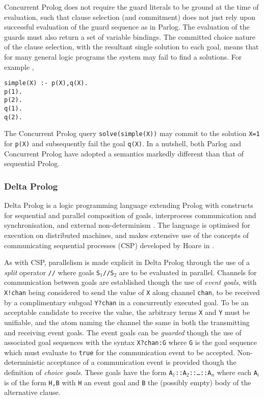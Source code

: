 Concurrent Prolog does not require the guard literals to be ground at
the time of evaluation, such that clause selection (and commitment)
does not just rely upon successful evaluation of the guard sequence as
in Parlog.  The evaluation of the guards must also return a set of
variable bindings.  The committed choice nature of the clause
selection, with the resultant single solution to each goal, means that
for many general logic programs the system may fail to find a
solutions.  For example \cite{Wis86},

\begin{verbatim}
simple(X) :- p(X),q(X).
p(1).
p(2).
q(1).
q(2).
\end{verbatim}
The Concurrent Prolog query \texttt{solve(simple(X))} may commit to the solution
\texttt{X=1} for \texttt{p(X)} and subsequently fail the goal \texttt{q(X)}.
In a nutshell, both Parlog and Concurrent Prolog have adopted a semantics markedly
different than that of sequential Prolog.

\subsubsection{Delta Prolog}


Delta Prolog is a logic programming language extending Prolog with constructs for
sequential and parallel composition of goals, interprocess communication and
synchronisation, and external non-determinism \cite{CMCP92}.  The language is
optimised for execution on distributed machines, and makes extensive use of the
concepts of communicating sequential processes (CSP)
developed by Hoare in \cite{Hoa85}.

As with CSP, parallelism is made explicit in Delta Prolog through the use of a 
\textit{split} operator \texttt{//} where goals \texttt{S$_1$//S$_2$} are to be
evaluated in parallel.  Channels for communication between goals are established 
though the use of \textit{event goals}, with \texttt{X!chan} being considered to
send the value of \texttt{X} along channel \texttt{chan}, to be received by a
complimentary subgoal \texttt{Y?chan} in a concurrently executed goal.  To be an
acceptable candidate to receive the value, the 
arbitrary terms \texttt{X} and \texttt{Y} must
be unifiable, and the atom naming the channel the same in both the transmitting and
receiving event goals.
The event goals can be \textit{guarded} though the use of associated goal sequences
with the syntax \texttt{X?chan:G} where \texttt{G} is the goal sequence which must
evaluate to \texttt{true} for the communication event to be accepted.  Non-deterministic
acceptance of a communication event is provided though the definition of \textit{choice
goals}.  These goals have the form \texttt{A$_1$::A$_2$::\ldots::A$_n$} where each
\texttt{A$_i$} is of the form \texttt{H,B} with \texttt{H} an event goal and \texttt{B}
the (possibly empty) body of the alternative clause.

